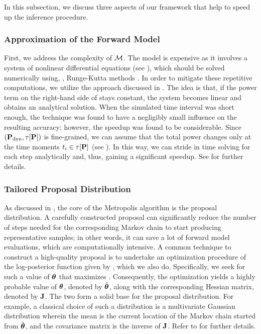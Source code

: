 In this subsection, we discuss three aspects of our framework that help to speed up the inference procedure.

\subsubsection{Approximation of the Forward Model} 
First, we address the complexity of $\model$. The model is expensive as it involves a system of nonlinear differential equations (see ), which should be solved numerically using, \eg, Runge-Kutta methods \cite{press2007}. In order to mitigate these repetitive computations, we utilize the approach discussed in \cite{ukhov2012}.
The idea is that, if the power term on the right-hand side of  stays constant, the system becomes linear and obtains an analytical solution. When the simulated time interval was short enough, the technique was found to have a negligibly small influence on the resulting accuracy; however, the speedup was found to be considerable.
Since $(\mathbf{P}_{\text{dyn}}, \tau[\mathbf{P}])$ is fine-grained, we can assume that the total power changes only at the time moments $t_i \in \tau[\mathbf{P}]$ (see ). In this way, we can stride in time solving  for each step analytically and, thus, gaining a significant speedup. See \cite{ukhov2012} for further details.

\subsubsection{Tailored Proposal Distribution} 
As discussed in , the core of the Metropolis algorithm is the proposal distribution. A carefully constructed proposal can significantly reduce the number of steps needed for the corresponding Markov chain to start producing representative samples; in other words, it can save a lot of forward model evaluations, which are computationally intensive.
A common technique to construct a high-quality proposal is to undertake an optimization procedure of the log-posterior function given by , which we also do. Specifically, we seek for such a value of ${\boldsymbol\theta}$ that maximizes .
Consequently, the optimization yields a highly probable value of ${\boldsymbol\theta}$, denoted by $\hat{{\boldsymbol\theta}}$, along with the corresponding Hessian matrix, denoted by $\mathbf{J}$. The two form a solid base for the proposal distribution.
For example, a classical choice of such a distribution is a multivariate Gaussian distribution wherein the mean is the current location of the Markov chain started from $\hat{{\boldsymbol\theta}}$, and the covariance matrix is the inverse of $\mathbf{J}$. Refer to \cite{gelman2004} for further details.


